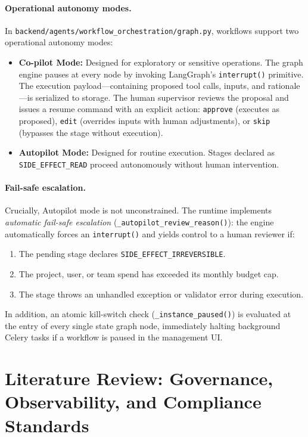 \documentclass[10pt,a4paper,twocolumn]{article}
\begin{document}
\paragraph{Operational autonomy modes.} In \texttt{backend/agents/workflow_orchestration/graph.py}, workflows support two operational autonomy modes:
\begin{itemize}[leftmargin=*]
  \item \textbf{Co-pilot Mode:} Designed for exploratory or sensitive operations. The graph engine pauses at every node by invoking LangGraph's \texttt{interrupt()} primitive. The execution payload---containing proposed tool calls, inputs, and rationale---is serialized to storage. The human supervisor reviews the proposal and issues a resume command with an explicit action: \texttt{approve} (executes as proposed), \texttt{edit} (overrides inputs with human adjustments), or \texttt{skip} (bypasses the stage without execution).
  \item \textbf{Autopilot Mode:} Designed for routine execution. Stages declared as \texttt{SIDE\_EFFECT\_READ} proceed autonomously without human intervention.
\end{itemize}

\paragraph{Fail-safe escalation.} Crucially, Autopilot mode is not unconstrained. The runtime implements \emph{automatic fail-safe escalation} (\texttt{\_autopilot\_review\_reason()}): the engine automatically forces an \texttt{interrupt()} and yields control to a human reviewer if:
\begin{enumerate}[leftmargin=*]
  \item The pending stage declares \texttt{SIDE\_EFFECT\_IRREVERSIBLE}.
  \item The project, user, or team spend has exceeded its monthly budget cap.
  \item The stage throws an unhandled exception or validator error during execution.
\end{enumerate}
In addition, an atomic kill-switch check (\texttt{\_instance\_paused()}) is evaluated at the entry of every single state graph node, immediately halting background Celery tasks if a workflow is paused in the management UI.

\section{Literature Review: Governance, Observability, and Compliance Standards}
\label{sec:gov}
\end{document}
